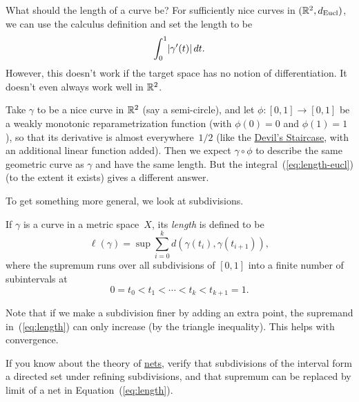 \documentclass[12pt]{amsart}
\begin{document}
What should the length of a curve be? For sufficiently nice curves in
$(\mathbb R^2, d_{\text{Eucl}})$, we can use the calculus definition and set
the length to be
\begin{equation}
  \label{eq:length-eucl}
  \int_0^1 \lvert\gamma'(t)\rvert\,dt.
\end{equation}
However, this doesn't work if the target space has no notion of
differentiation. It doesn't even always work well in $\mathbb R^2$.

\begin{example}
  Take $\gamma$ to be a nice curve in $\mathbb R^2$ (say a semi-circle), and
  let $\phi \colon [0,1] \to [0,1]$ be a weakly monotonic
  reparametrization function (with $\phi(0) = 0$ and $\phi(1) = 1$),
  so that its derivative is almost everywhere~$1/2$ (like the
  \href{https://en.wikipedia.org/wiki/Cantor_function}{Devil's
    Staircase}, with an additional linear function added). Then we
  expect $\gamma \circ \phi$ to describe the same geometric curve as
  $\gamma$ and have the same length. But the
  integral~(\ref{eq:length-eucl}) (to the extent it exists) gives a
  different answer.
\end{example}

To get something more general, we look at subdivisions.

\begin{definition}\label{def:length}
  If $\gamma$ is a curve in a metric space~$X$, its \emph{length} is
  defined to be
  \begin{equation}\label{eq:length}
    \ell(\gamma) = \sup \sum_{i=0}^k d(\gamma(t_i), \gamma(t_{i+1})),
  \end{equation}
  where the supremum runs over all subdivisions of $[0,1]$ into
  a finite number of subintervals at
  \[
    0 = t_0 < t_1 < \cdots < t_k < t_{k+1} = 1.
  \]
\end{definition}

Note that if we make a subdivision finer by adding an extra point, the
supremand in~(\ref{eq:length}) can only increase (by the triangle
inequality). This helps with convergence.

\begin{exercise}
  If you know about the theory of
  \href{https://en.wikipedia.org/wiki/Net_(mathematics)}{nets}, verify
  that subdivisions of the interval form a directed set under refining
  subdivisions, and that supremum can be replaced by limit of a net
  in Equation~(\ref{eq:length}).
\end{exercise}
\end{document}
